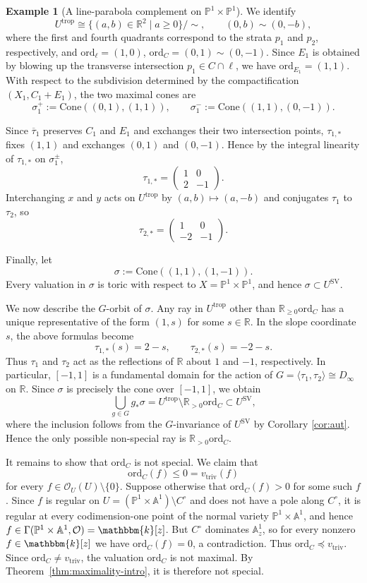 \documentclass[reqno, 12pt]{amsart}
\theoremstyle{definition}
\newtheorem{expl}[prop]{Example}
\newcommand{\bP}{\mathbb{P}}
\newcommand{\bR}{\mathbb{R}}
\newcommand{\bA}{\mathbb{A}}
\newcommand{\bk}{\mathbbm{k}}
\newcommand{\cO}{\mathcal{O}}
\newcommand{\ord}{\mathrm{ord}}
\newcommand{\trop}{\mathrm{trop}}
\newcommand{\triv}{\mathrm{triv}}
\newcommand{\SV}{\mathrm{SV}}
\newcommand{\Cone}{\mathrm{Cone}}
\numberwithin{equation}{section}
\begin{document}
\begin{expl}[A line-parabola complement on $\bP^1\times\bP^1$]
We identify
\[
U^{\trop}\cong
\{(a,b)\in\bR^2\mid a\geq0\}/\sim,
\qquad
(0,b)\sim(0,-b),
\]
where the first and fourth quadrants correspond to the strata $p_1$
and $p_2$, respectively, and
$\ord_\ell=(1,0)$, $\ord_C=(0,1)\sim(0,-1)$.
Since $E_1$ is obtained by blowing up the transverse intersection
$p_1 \in C\cap\ell$, we have
$\ord_{E_1}=(1,1)$.
With respect to the subdivision determined by the compactification
$(X_1,C_1+E_1)$, the two maximal cones are
\[
\sigma_1^+:=\Cone((0,1),(1,1)),
\qquad
\sigma_1^-:=\Cone((1,1),(0,-1)).
\]

Since $\overline\tau_1$ preserves $C_1$ and $E_1$ and exchanges their
two intersection points, $\tau_{1,*}$ fixes $(1,1)$ and exchanges
$(0,1)$ and $(0,-1)$. Hence by the integral linearity of $\tau_{1,*}$ on $\sigma^{\pm}_1$,
\[
\tau_{1,*}
=
\begin{pmatrix}
1&0\\
2&-1
\end{pmatrix}.
\]
Interchanging $x$ and $y$ acts on $U^{\trop}$ by
$(a,b)\mapsto(a,-b)$ and conjugates $\tau_1$ to $\tau_2$, so
\[
\tau_{2,*}
=
\begin{pmatrix}
1&0\\
-2&-1
\end{pmatrix}.
\]

Finally, let
\[
\sigma:=\Cone((1,1),(1,-1)).
\]
Every valuation in $\sigma$ is toric with respect to
$X=\bP^1\times\bP^1$, and hence
$\sigma\subset U^{\SV}$.

We now describe the $G$-orbit of $\sigma$. Any ray in
$U^{\trop}$ other than $\bR_{\geq 0}\ord_C$ has a unique representative
of the form $(1,s)$ for some $s\in\bR$. In the slope coordinate $s$,
the above formulas become
\[
\tau_{1,*}(s)=2-s,
\qquad
\tau_{2,*}(s)=-2-s.
\]
Thus $\tau_1$ and $\tau_2$ act as the reflections of $\bR$ about
$1$ and $-1$, respectively. In particular, $[-1,1]$ is a fundamental
domain for the action of $
G=\langle\tau_1,\tau_2\rangle\cong D_\infty$ 
on $\bR$. Since $\sigma$ is precisely the cone over $[-1,1]$, we obtain
\[
\bigcup_{g\in G}g_*\sigma
=
U^{\trop}\setminus\bR_{>0}\ord_C \subset U^{\SV},
\]
where the inclusion follows from the $G$-invariance of $U^{\SV}$ by Corollary \ref{cor:aut}.
Hence the only possible non-special ray is
$\bR_{>0}\ord_C$.

It remains to show that $\ord_C$ is not special. We claim that
\[
\ord_C(f)\leq 0=v_{\triv}(f)
\]
for every $f\in\cO_U(U)\setminus\{0\}$. Suppose otherwise that
$\ord_C(f)>0$ for some such $f$.
Since $f$ is regular on $U=(\bP^1\times\bA^1)\setminus C^\circ$ and does not have a pole along $C^\circ$, it is regular at every codimension-one
point of the normal variety $\bP^1\times\bA^1$, and hence $f\in \Gamma(\bP^1\times\bA^1,\cO)
=\bk[z]$.
But $C^\circ$ dominates $\bA^1_z$, so for every nonzero
$f\in\bk[z]$ we have
$\ord_C(f)=0$,
a contradiction. Thus
$\ord_C\preceq v_{\triv}$.
Since $\ord_C\neq v_{\triv}$, the valuation $\ord_C$ is not maximal.
By Theorem~\ref{thm:maximality-intro}, it is therefore not special.


\end{expl}
\end{document}
